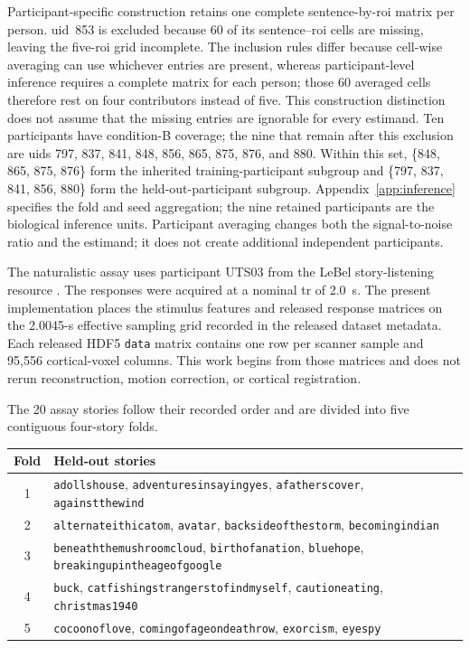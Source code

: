 Participant-specific construction retains one complete sentence-by-\ac{roi} matrix per person.
\ac{uid}~853 is excluded because 60 of its sentence--\ac{roi} cells are missing, leaving the five-\ac{roi} grid incomplete.
The inclusion rules differ because cell-wise averaging can use whichever entries are present, whereas participant-level inference requires a complete matrix for each person; those 60 averaged cells therefore rest on four contributors instead of five.
This construction distinction does not assume that the missing entries are ignorable for every estimand.
Ten participants have condition-B coverage; the nine that remain after this exclusion are \acp{uid} 797, 837, 841, 848, 856, 865, 875, 876, and 880.
Within this set, \{848, 865, 875, 876\} form the inherited training-participant subgroup and \{797, 837, 841, 856, 880\} form the held-out-participant subgroup.
Appendix~\ref{app:inference} specifies the fold and seed aggregation; the nine retained participants are the biological inference units.
Participant averaging changes both the signal-to-noise ratio and the estimand; it does not create additional independent participants. 

The naturalistic assay uses participant UTS03 from the LeBel story-listening resource \autocite{lebel2023}.
The responses were acquired at a nominal \ac{tr} of 2.0~s. 
The present implementation places the stimulus features and released response matrices on the 2.0045-s effective sampling grid recorded in the released dataset metadata. 
Each released HDF5 \texttt{data} matrix contains one row per scanner sample and 95,556 cortical-voxel columns.
This work begins from those matrices and does not rerun reconstruction, motion correction, or cortical registration. 

The 20 assay stories follow their recorded order and are divided into five contiguous four-story folds. 

\begin{center}
\small
\begin{tabular}{@{}cl@{}}
\toprule
Fold & Held-out stories \\
\midrule
1 & \texttt{adollshouse}, \texttt{adventuresinsayingyes}, \texttt{afatherscover}, \texttt{againstthewind} \\
2 & \texttt{alternateithicatom}, \texttt{avatar}, \texttt{backsideofthestorm}, \texttt{becomingindian} \\
3 & \texttt{beneaththemushroomcloud}, \texttt{birthofanation}, \texttt{bluehope}, \texttt{breakingupintheageofgoogle} \\
4 & \texttt{buck}, \texttt{catfishingstrangerstofindmyself}, \texttt{cautioneating}, \texttt{christmas1940} \\
5 & \texttt{cocoonoflove}, \texttt{comingofageondeathrow}, \texttt{exorcism}, \texttt{eyespy} \\
\bottomrule
\end{tabular}
\end{center}

